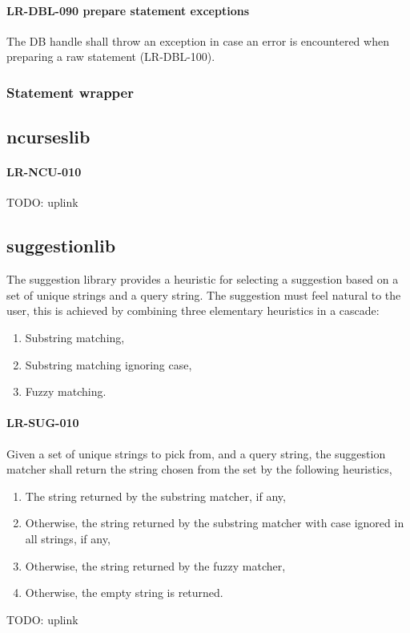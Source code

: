 \paragraph{LR-DBL-090 prepare statement exceptions}
The DB handle shall throw an exception in case an error is encountered when
preparing a raw statement (LR-DBL-100).

\subsubsection{Statement wrapper}

\subsection{ncurses\textunderscore lib}
\paragraph{LR-NCU-010}
TODO: uplink

\subsection{suggestion\textunderscore lib}
The suggestion library provides a heuristic for selecting a suggestion
based on a set of unique strings and a query string. The suggestion
must feel natural to the user, this is achieved by combining three
elementary heuristics in a cascade:
\begin{enumerate}
\item Substring matching,
\item Substring matching ignoring case,
\item Fuzzy matching.
\end{enumerate}

\paragraph{LR-SUG-010}
Given a set of unique strings to pick from, and a query string,
the suggestion matcher shall return the string chosen from the set
by the following heuristics,
\begin{enumerate}
\item The string returned by the substring matcher, if any,
\item Otherwise, the string returned by the substring matcher
      with case ignored in all strings, if any,
\item Otherwise, the string returned by the fuzzy matcher,
\item Otherwise, the empty string is returned.
\end{enumerate}
TODO: uplink

